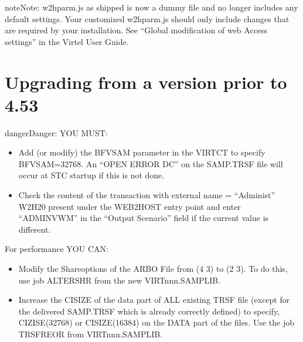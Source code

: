 \documentclass[letterpaper,10pt,english]{sphinxmanual}
\begin{document}
\begin{sphinxadmonition}{note}{Note:}
\sphinxAtStartPar
w2hparm.js as shipped is now a dummy file and no longer includes any default settings. Your customized w2hparm.js should only include changes that are required by your installation. See “Global modification of web Access settings” in the Virtel User Guide.
\end{sphinxadmonition}

\ignorespaces 

\section{Upgrading from a version prior to 4.53}
\label{\detokenize{Migration_Guide:upgrading-from-a-version-prior-to-4-53}}\label{\detokenize{Migration_Guide:index-3}}
\begin{sphinxadmonition}{danger}{Danger:}
\sphinxAtStartPar
YOU MUST:
\end{sphinxadmonition}
\begin{itemize}
\item {} 
\sphinxAtStartPar
Add (or modify) the BFVSAM parameter in the VIRTCT to specify BFVSAM=32768. An “OPEN ERROR DC” on the SAMP.TRSF file will occur at STC startup if this is not done.

\item {} 
\sphinxAtStartPar
Check the content of the transaction with external name = “Administ” \sphinxhyphen{} W2H\sphinxhyphen{}20 \sphinxhyphen{} present under the WEB2HOST entry point and enter “ADMINVWM” in the “Output Scenario” field if the current value is different.

\end{itemize}

\sphinxAtStartPar
For performance YOU CAN:
\begin{itemize}
\item {} 
\sphinxAtStartPar
Modify the Shareoptions of the ARBO File from (4 3) to (2 3). To do this, use job ALTERSHR from the new VIRTnnn.SAMPLIB.

\item {} 
\sphinxAtStartPar
Increase the CISIZE of the data part of ALL existing TRSF file (except for the delivered SAMP.TRSF which is already correctly defined) to specify, CIZISE(32768) or CISIZE(16384) on the DATA part of the files. Use the job TRSFREOR from VIRTnnn.SAMPLIB.

\end{itemize}
\end{document}
